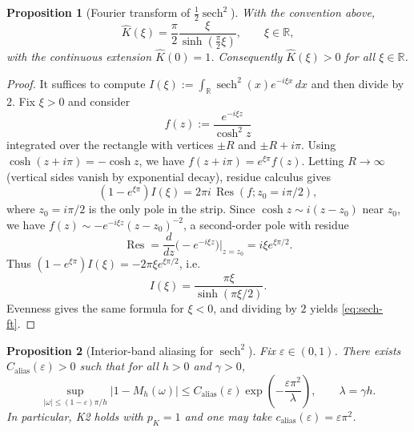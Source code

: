 \documentclass[11pt]{article}
\newtheorem{proposition}{Proposition}
\newcommand{\R}{\mathbb{R}}
\newcommand{\wh}[1]{\widehat{#1}}
\newcommand{\sech}{\operatorname{sech}}
\begin{document}
\begin{proposition}[Fourier transform of $\tfrac12\sech^2$]
With the convention above,
\begin{equation}
\wh K(\xi)=\frac{\pi}{2}\frac{\xi}{\sinh\!\left(\frac{\pi}{2}\xi\right)},
\qquad \xi\in\R,
\label{eq:sech-ft}
\end{equation}
with the continuous extension $\wh K(0)=1$. Consequently $\wh K(\xi)>0$ for all $\xi\in\R$.
\end{proposition}

\begin{proof}
It suffices to compute $I(\xi):=\int_{\R}\sech^2(x)e^{-i\xi x}\,dx$ and then divide by $2$. Fix $\xi>0$ and consider
\[
f(z):=\frac{e^{-i\xi z}}{\cosh^2 z}
\]
integrated over the rectangle with vertices $\pm R$ and $\pm R+i\pi$. Using $\cosh(z+i\pi)=-\cosh z$, we have $f(z+i\pi)=e^{\xi\pi}f(z)$. Letting $R\to\infty$ (vertical sides vanish by exponential decay), residue calculus gives
\[
(1-e^{\xi\pi})I(\xi)=2\pi i\,\operatorname{Res}(f;z_0=i\pi/2),
\]
where $z_0=i\pi/2$ is the only pole in the strip. Since $\cosh z\sim i(z-z_0)$ near $z_0$, we have $f(z)\sim -e^{-i\xi z}(z-z_0)^{-2}$, a second-order pole with residue
\[
\operatorname{Res}=\frac{d}{dz}\bigl(-e^{-i\xi z}\bigr)\big|_{z=z_0}=i\xi e^{\xi\pi/2}.
\]
Thus $(1-e^{\xi\pi})I(\xi)=-2\pi\xi e^{\xi\pi/2}$, i.e.
\[
I(\xi)=\frac{\pi\xi}{\sinh(\pi\xi/2)}.
\]
Evenness gives the same formula for $\xi<0$, and dividing by $2$ yields \eqref{eq:sech-ft}.
\end{proof}

\begin{proposition}[Interior-band aliasing for $\sech^2$]
Fix $\varepsilon\in(0,1)$. There exists $C_{\mathrm{alias}}(\varepsilon)>0$ such that for all $h>0$ and $\gamma>0$,
\begin{equation}
\sup_{|\omega|\le (1-\varepsilon)\pi/h}
|1-M_h(\omega)|
\le
C_{\mathrm{alias}}(\varepsilon)\exp\!\left(-\frac{\varepsilon\pi^2}{\lambda}\right),
\qquad \lambda=\gamma h.
\label{eq:sech-aliasing}
\end{equation}
In particular, K2 holds with $p_K=1$ and one may take $c_{\mathrm{alias}}(\varepsilon)=\varepsilon\pi^2$.
\end{proposition}
\end{document}
